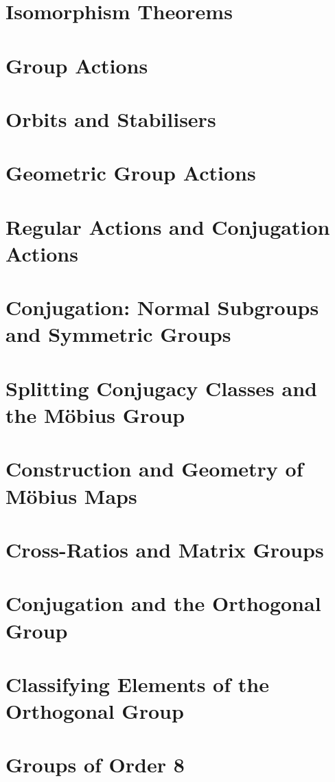 \documentclass{article}
\begin{document}
\section{Isomorphism Theorems}

\section{Group Actions}

\section{Orbits and Stabilisers}

\section{Geometric Group Actions}

\section{Regular Actions and Conjugation Actions}

\section{Conjugation: Normal Subgroups and Symmetric Groups}

\section{Splitting Conjugacy Classes and the M\"obius Group}

\section{Construction and Geometry of M\"obius Maps}

\section{Cross-Ratios and Matrix Groups}

\section{Conjugation and the Orthogonal Group}

\section{Classifying Elements of the Orthogonal Group}

\section{Groups of Order 8}

\end{document}
